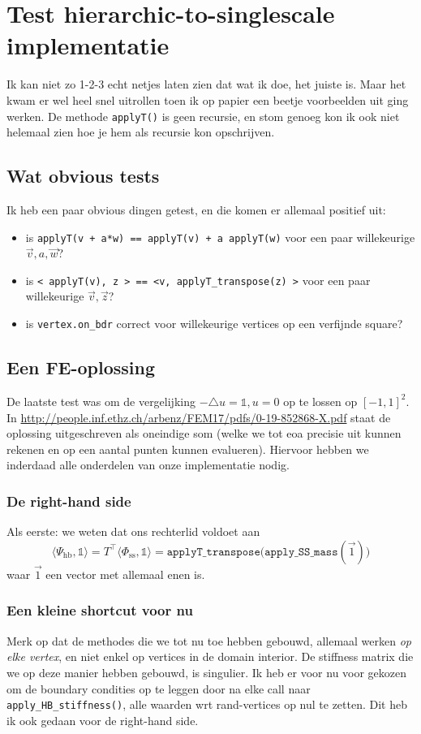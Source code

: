 \documentclass[11pt,a4paper]{amsart}
\theoremstyle{definition}
\newcommand{\bbone}{\mathds{1}}
\begin{document}
\section*{Test hierarchic-to-singlescale implementatie}
Ik kan niet zo 1-2-3 echt netjes laten zien dat wat ik doe, het juiste is. Maar
het kwam er wel heel snel uitrollen toen ik op papier een beetje voorbeelden uit
ging werken. De methode \texttt{applyT()} is geen recursie, en stom genoeg kon ik
ook niet helemaal zien hoe je hem als recursie kon opschrijven. 

\subsection*{Wat obvious tests}
Ik heb een paar obvious dingen getest, en die komen er allemaal positief uit:
\begin{itemize}
  \item is \texttt{applyT(v + a*w) == applyT(v) + a applyT(w)} voor een paar willekeurige $\vec v, a, \vec w$?
  \item is \texttt{< applyT(v), z > == <v, applyT\_transpose(z) >} voor een paar willekeurige $\vec v, \vec z$?
  \item is \texttt{vertex.on\_bdr} correct voor willekeurige vertices op een verfijnde square?
\end{itemize}

\subsection*{Een FE-oplossing}
De laatste test was om de vergelijking $- \triangle u = \bbone, u = 0$ op te lossen op $[-1,1]^2$.
In \url{http://people.inf.ethz.ch/arbenz/FEM17/pdfs/0-19-852868-X.pdf} staat
de oplossing uitgeschreven als oneindige som (welke we tot eoa precisie uit
kunnen rekenen en op een aantal punten kunnen evalueren). Hiervoor hebben we
inderdaad alle onderdelen van onze implementatie nodig.

\subsubsection*{De right-hand side} Als eerste: we weten dat ons rechterlid voldoet aan
\[
  \langle \Psi_{\text{hb}}, \bbone\rangle = T^\top \langle \Phi_{\text{ss}}, \bbone\rangle =
  \mathtt{applyT\_transpose(apply\_SS\_mass}(\vec 1))
\]
waar $\vec 1$ een vector met allemaal enen is.

\subsubsection*{Een kleine shortcut voor nu}
Merk op dat de methodes die we tot nu toe hebben gebouwd, allemaal werken
\emph{op elke vertex}, en niet enkel op vertices in de domain interior. De
stiffness matrix die we op deze manier hebben gebouwd, is singulier. Ik heb er
voor nu voor gekozen om de boundary condities op te leggen door na elke call naar
\texttt{apply\_HB\_stiffness()}, alle waarden wrt rand-vertices op nul te zetten.
Dit heb ik ook gedaan voor de right-hand side.
\end{document}
